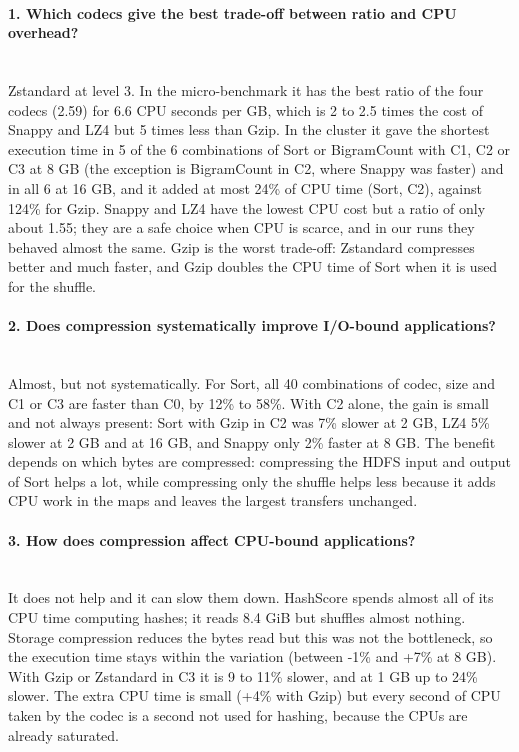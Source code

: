 \documentclass[11pt,a4paper]{article}
\begin{document}
\paragraph{1. Which codecs give the best trade-off between ratio and CPU overhead?}\mbox{}\\
Zstandard at level 3. In the micro-benchmark it has the best ratio of the four codecs (2.59) for 6.6 CPU seconds per GB, which is 2 to 2.5 times the cost of Snappy and LZ4 but 5 times less than Gzip. In the cluster it gave the shortest execution time in 5 of the 6 combinations of Sort or BigramCount with C1, C2 or C3 at 8 GB (the exception is BigramCount in C2, where Snappy was faster) and in all 6 at 16 GB, and it added at most 24\% of CPU time (Sort, C2), against 124\% for Gzip. Snappy and LZ4 have the lowest CPU cost but a ratio of only about 1.55; they are a safe choice when CPU is scarce, and in our runs they behaved almost the same. Gzip is the worst trade-off: Zstandard compresses better and much faster, and Gzip doubles the CPU time of Sort when it is used for the shuffle.

\paragraph{2. Does compression systematically improve I/O-bound applications?}\mbox{}\\
Almost, but not systematically. For Sort, all 40 combinations of codec, size and C1 or C3 are faster than C0, by 12\% to 58\%. With C2 alone, the gain is small and not always present: Sort with Gzip in C2 was 7\% slower at 2 GB, LZ4 5\% slower at 2 GB and at 16 GB, and Snappy only 2\% faster at 8 GB. The benefit depends on which bytes are compressed: compressing the HDFS input and output of Sort helps a lot, while compressing only the shuffle helps less because it adds CPU work in the maps and leaves the largest transfers unchanged.

\paragraph{3. How does compression affect CPU-bound applications?}\mbox{}\\
It does not help and it can slow them down. HashScore spends almost all of its CPU time computing hashes; it reads 8.4 GiB but shuffles almost nothing. Storage compression reduces the bytes read but this was not the bottleneck, so the execution time stays within the variation (between -1\% and +7\% at 8 GB). With Gzip or Zstandard in C3 it is 9 to 11\% slower, and at 1 GB up to 24\% slower. The extra CPU time is small (+4\% with Gzip) but every second of CPU taken by the codec is a second not used for hashing, because the CPUs are already saturated.
\end{document}
